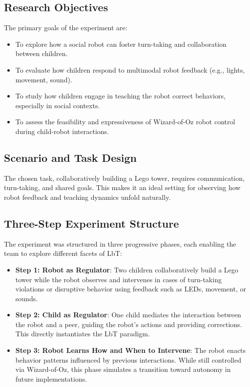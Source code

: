 \documentclass[a4paper]{usiinfbachelorproject}
\begin{document}
\subsection*{\textbf{Research Objectives}}
The primary goals of the experiment are:
\begin{itemize}
    \item To explore how a social robot can foster turn-taking and collaboration between children.
    \item To evaluate how children respond to multimodal robot feedback (e.g., lights, movement, sound).
    \item To study how children engage in teaching the robot correct behaviors, especially in social contexts.
    \item To assess the feasibility and expressiveness of Wizard-of-Oz robot control during child-robot interactions.
\end{itemize}

\subsection*{\textbf{Scenario and Task Design}}
The chosen task, collaboratively building a Lego tower, requires communication, turn-taking, and shared goals.
This makes it an ideal setting for observing how robot feedback and teaching dynamics unfold naturally.

\subsection*{\textbf{Three-Step Experiment Structure}}
The experiment was structured in three progressive phases, each enabling the team to explore different facets of LbT:

\begin{itemize}
    \item \textbf{Step 1: Robot as Regulator}: Two children collaboratively build a Lego tower while the robot observes and intervenes in cases of turn-taking violations or disruptive behavior using feedback such as LEDs, movement, or sounds.
    \item \textbf{Step 2: Child as Regulator}: One child mediates the interaction between the robot and a peer, guiding the robot's actions and providing corrections. This directly instantiates the LbT paradigm.
    \item \textbf{Step 3: Robot Learns How and When to Intervene}: The robot enacts behavior patterns influenced by previous interactions. While still controlled via Wizard-of-Oz, this phase simulates a transition toward autonomy in future implementations.
\end{itemize}
\end{document}
